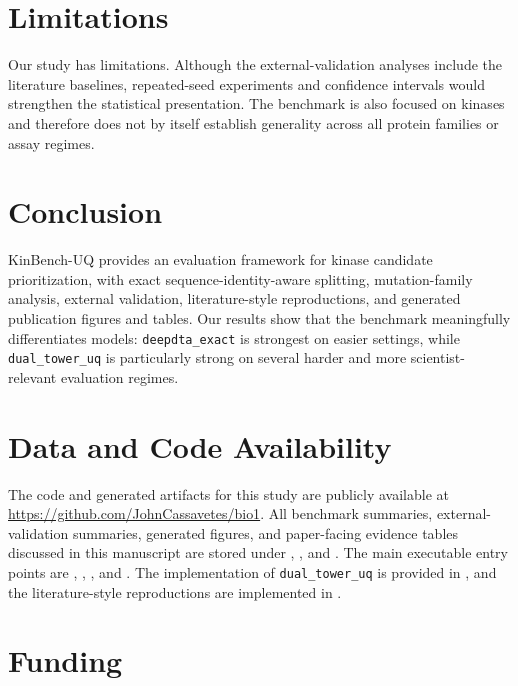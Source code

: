 \documentclass[11pt]{article}
\begin{document}
\section{Limitations}

Our study has limitations. Although the external-validation analyses include
the literature baselines, repeated-seed experiments and confidence intervals
would strengthen the statistical presentation. The benchmark is also focused on
kinases and therefore does not by itself establish generality across all
protein families or assay regimes.

\section{Conclusion}

KinBench-UQ provides an evaluation framework for kinase candidate
prioritization, with exact sequence-identity-aware splitting, mutation-family
analysis, external validation, literature-style reproductions, and generated
publication figures and tables.
Our results show that the benchmark meaningfully differentiates models:
\texttt{deepdta\_exact} is strongest on easier settings, while
\texttt{dual\_tower\_uq} is particularly strong on several harder and more
scientist-relevant evaluation regimes.

\section*{Data and Code Availability}

The code and generated artifacts for this study are publicly available at
\url{https://github.com/JohnCassavetes/bio1}. All benchmark summaries,
external-validation summaries, generated figures, and paper-facing evidence
tables discussed in this manuscript are stored under ,
, and . The main executable entry points are
,
,
, and
. The implementation of
\texttt{dual\_tower\_uq} is provided in
, and the
literature-style reproductions are implemented in
.

\section*{Funding}
\end{document}
